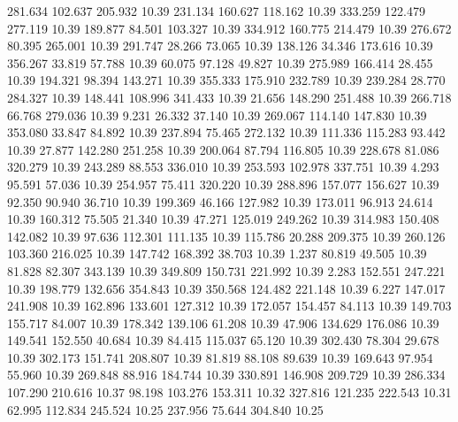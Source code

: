  281.634  102.637  205.932        10.39
 231.134  160.627  118.162        10.39
 333.259  122.479  277.119        10.39
 189.877   84.501  103.327        10.39
 334.912  160.775  214.479        10.39
 276.672   80.395  265.001        10.39
 291.747   28.266   73.065        10.39
 138.126   34.346  173.616        10.39
 356.267   33.819   57.788        10.39
  60.075   97.128   49.827        10.39
 275.989  166.414   28.455        10.39
 194.321   98.394  143.271        10.39
 355.333  175.910  232.789        10.39
 239.284   28.770  284.327        10.39
 148.441  108.996  341.433        10.39
  21.656  148.290  251.488        10.39
 266.718   66.768  279.036        10.39
   9.231   26.332   37.140        10.39
 269.067  114.140  147.830        10.39
 353.080   33.847   84.892        10.39
 237.894   75.465  272.132        10.39
 111.336  115.283   93.442        10.39
  27.877  142.280  251.258        10.39
 200.064   87.794  116.805        10.39
 228.678   81.086  320.279        10.39
 243.289   88.553  336.010        10.39
 253.593  102.978  337.751        10.39
   4.293   95.591   57.036        10.39
 254.957   75.411  320.220        10.39
 288.896  157.077  156.627        10.39
  92.350   90.940   36.710        10.39
 199.369   46.166  127.982        10.39
 173.011   96.913   24.614        10.39
 160.312   75.505   21.340        10.39
  47.271  125.019  249.262        10.39
 314.983  150.408  142.082        10.39
  97.636  112.301  111.135        10.39
 115.786   20.288  209.375        10.39
 260.126  103.360  216.025        10.39
 147.742  168.392   38.703        10.39
   1.237   80.819   49.505        10.39
  81.828   82.307  343.139        10.39
 349.809  150.731  221.992        10.39
   2.283  152.551  247.221        10.39
 198.779  132.656  354.843        10.39
 350.568  124.482  221.148        10.39
   6.227  147.017  241.908        10.39
 162.896  133.601  127.312        10.39
 172.057  154.457   84.113        10.39
 149.703  155.717   84.007        10.39
 178.342  139.106   61.208        10.39
  47.906  134.629  176.086        10.39
 149.541  152.550   40.684        10.39
  84.415  115.037   65.120        10.39
 302.430   78.304   29.678        10.39
 302.173  151.741  208.807        10.39
  81.819   88.108   89.639        10.39
 169.643   97.954   55.960        10.39
 269.848   88.916  184.744        10.39
 330.891  146.908  209.729        10.39
 286.334  107.290  210.616        10.37
  98.198  103.276  153.311        10.32
 327.816  121.235  222.543        10.31
  62.995  112.834  245.524        10.25
 237.956   75.644  304.840        10.25
